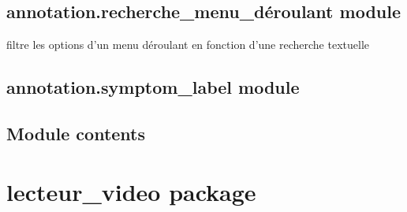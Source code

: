 \documentclass[letterpaper,10pt,english]{sphinxmanual}
\begin{document}
\section{annotation.recherche\_menu\_déroulant module}
\label{\detokenize{annotation:module-annotation.recherche_menu_deroulant}}\label{\detokenize{annotation:annotation-recherche-menu-deroulant-module}}

\begin{fulllineitems}
\label{\detokenize{annotation:annotation.recherche_menu_deroulant.filtrer_options}}
\pysigstartsignatures
{}
\pysigstopsignatures
\sphinxAtStartPar
filtre les options d’un menu déroulant en fonction d’une recherche textuelle

\end{fulllineitems}



\section{annotation.symptom\_label module}
\label{\detokenize{annotation:annotation-symptom-label-module}}

\section{Module contents}
\label{\detokenize{annotation:module-annotation}}\label{\detokenize{annotation:module-contents}}
\sphinxstepscope


\chapter{lecteur\_video package}
\label{\detokenize{lecteur_video:lecteur-video-package}}\label{\detokenize{lecteur_video::doc}}
\end{document}
